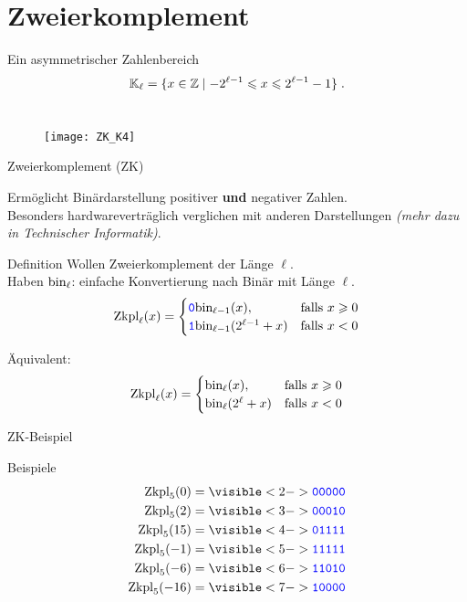 \section{Zweierkomplement}

\begin{frame}{Ein asymmetrischer Zahlenbereich}
	\[
	\mathbb{K}_{\ell} = \{ x\in \mathbb{Z} \mid -2^{\ell-1} \leqslant x \leqslant 2^{\ell-1} -1 \} \;.
	\]
	\\[0.2cm]
	
	\begin{figure}
		\centering
		\texttt{[image: ZK\_K4]}
	\end{figure}
	
\end{frame}

\begin{frame}{Zweierkomplement (ZK)}
	
	Ermöglicht Binärdarstellung positiver \textbf{und} negativer Zahlen. \\
	Besonders hardwareverträglich verglichen mit anderen Darstellungen \textit{(mehr dazu in Technischer Informatik)}.

	\begin{block}{Definition}
		Wollen Zweierkomplement der Länge $\ell$. \\ Haben $\text{bin}_\ell$: einfache Konvertierung nach Binär mit Länge $\ell$.
		$$\text{Zkpl}_\ell(x) = \begin{cases} \hbox{\textcolor{blue}{\texttt{0}}} \text{bin}_{\ell-1}(x), & \text{falls } x \geqslant 0 \\ 
										 \hbox{\textcolor{blue}{\texttt{1}}} \text{bin}_{\ell-1}(2^{\ell-1}+x) & \text{falls } x < 0\end{cases}$$
		
		Äquivalent:
		$$\text{Zkpl}_\ell(x) = \begin{cases} \text{bin}_{\ell}(x), & \text{falls } x \geqslant 0 \\ 
										 \text{bin}_{\ell}(2^{\ell}+x) & \text{falls } x < 0\end{cases}$$
	\end{block}
\end{frame}

\begin{frame}{ZK-Beispiel}
	\begin{block}{Beispiele}
		\begin{align*}
			\fZkpl_5(0)  &= \visible<2->{\word{00000}} \\
			\fZkpl_5(2) &= \visible<3->{\word{00010}} \\
			\fZkpl_5(15) &= \visible<4->{\word{01111}} \\
			\fZkpl_5(-1) &= \visible<5->{\word{11111}} \\
			\fZkpl_5(-6) &= \visible<6->{\word{11010}} \\
			\fZkpl_5(-16) &= \visible<7->{\word{10000}}
		\end{align*}
	\end{block}
\end{frame}

